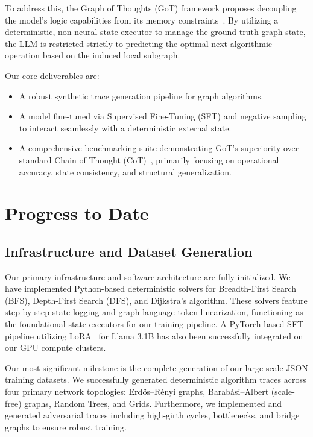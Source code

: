 \documentclass[sigplan,screen]{acmart}
\begin{document}
To address this, the Graph of Thoughts (GoT) framework proposes decoupling the model's logic capabilities from its memory constraints~\cite{besta2024got}. By utilizing a deterministic, non-neural state executor to manage the ground-truth graph state, the LLM is restricted strictly to predicting the optimal next algorithmic operation based on the induced local subgraph.

Our core deliverables are:
\begin{itemize}
    \item A robust synthetic trace generation pipeline for graph algorithms.
    \item A model fine-tuned via Supervised Fine-Tuning (SFT) and negative sampling to interact seamlessly with a deterministic external state.
    \item A comprehensive benchmarking suite demonstrating GoT's superiority over standard Chain of Thought (CoT)~\cite{wei2022cot}, primarily focusing on operational accuracy, state consistency, and structural generalization.
\end{itemize}

\section{Progress to Date}

\subsection{Infrastructure and Dataset Generation}

Our primary infrastructure and software architecture are fully initialized. We have implemented Python-based deterministic solvers for Breadth-First Search (BFS), Depth-First Search (DFS), and Dijkstra's algorithm. These solvers feature step-by-step state logging and graph-language token linearization, functioning as the foundational state executors for our training pipeline. A PyTorch-based SFT pipeline utilizing LoRA~\cite{hu2022lora} for Llama 3.1B has also been successfully integrated on our GPU compute clusters.

Our most significant milestone is the complete generation of our large-scale JSON training datasets. We successfully generated deterministic algorithm traces across four primary network topologies: Erd\H{o}s--R\'{e}nyi graphs, Barab\'{a}si--Albert (scale-free) graphs, Random Trees, and Grids. Furthermore, we implemented and generated adversarial traces including high-girth cycles, bottlenecks, and bridge graphs to ensure robust training.
\end{document}
